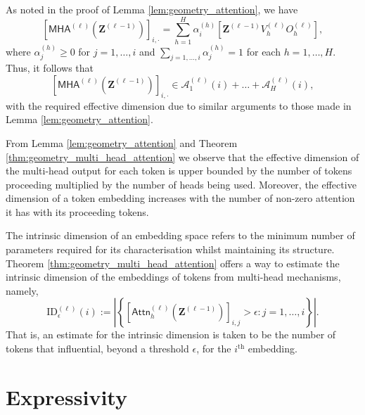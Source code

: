 \begin{tproof}
    As noted in the proof of Lemma \ref{lem:geometry_attention}, we have $$\left[\mathsf{MHA}^{(\ell)}\left(\mathbf{Z}^{(\ell-1)}\right)\right]_{i,\cdot}=\sum_{h=1}^H\alpha^{(h)}_i\left[\mathbf{Z}^{(\ell-1)}V_h^{(\ell)}O_h^{(\ell)}\right],$$where $\alpha^{(h)}_j\geq0$ for $j=1,\dots,i$ and $\sum_{j=1,\dots,i}\alpha^{(h)}_j=1$ for each $h=1,\dots,H$. Thus, it follows that $$\left[\mathsf{MHA}^{(\ell)}\left(\mathbf{Z}^{(\ell-1)}\right)\right]_{i,\cdot}\in\mathcal{A}_1^{(\ell)}(i)+\dots+\mathcal{A}_H^{(\ell)}(i),$$with the required effective dimension due to similar arguments to those made in Lemma \ref{lem:geometry_attention}.
\end{tproof}

\begin{remark}
    From Lemma \ref{lem:geometry_attention} and Theorem \ref{thm:geometry_multi_head_attention} we observe that the effective dimension of the multi-head output for each token is upper bounded by the number of tokens proceeding multiplied by the number of heads being used. Moreover, the effective dimension of a token embedding increases with the number of non-zero attention it has with its proceeding tokens.
\end{remark}

The intrinsic dimension of an embedding space refers to the minimum number of parameters required for its characterisation whilst maintaining its structure. Theorem \ref{thm:geometry_multi_head_attention} offers a way to estimate the intrinsic dimension of the embeddings of tokens from multi-head mechanisms, namely, $$\mathrm{ID}^{(\ell)}_{\epsilon}(i):=\left\vert\left\{\left[\mathsf{Attn}_h^{(\ell)}\left(\mathbf{Z}^{(\ell-1)}\right)\right]_{i,j}>\epsilon:j=1,\dots,i\right\}\right\vert.$$That is, an estimate for the intrinsic dimension is taken to be the number of tokens that influential, beyond a threshold $\epsilon$, for the $i^\text{th}$ embedding.

\section{Expressivity}\label{sec:expressivity}

